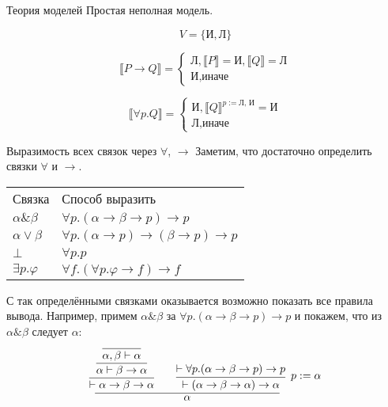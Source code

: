 \documentclass[aspectratio=169]{beamer}
\begin{document}
\begin{frame}{Теория моделей}
Простая неполная модель.

$$V = \{ \text{И}, \text{Л} \}$$

 	
 	
 \begin{center}
 		\begin{equation*}
 		\llbracket P\rightarrow Q\rrbracket = 
 		\begin{cases}
 			\text{Л}, \llbracket P\rrbracket = \text{И}, \llbracket Q\rrbracket = \text{Л} \\
 			\text{И}, \text{иначе}
 		\end{cases}
 	\end{equation*}
 \end{center}
 	
 	
 	\begin{equation*}
 		\llbracket\forall p.Q\rrbracket = 
 		\begin{cases}
 			\text{И}, \llbracket Q\rrbracket^{p:=\text{Л, И}} = \text{И} \\
 			\text{Л}, \text{иначе}
 		\end{cases}
 	\end{equation*}


\end{frame}

\begin{frame}[fragile]{Выразимость всех связок через $\forall$, $\rightarrow$}
Заметим, что достаточно определить связки $\forall$ и $\rightarrow$.\vspace{0.5cm}

\begin{tabular}{ll}
 Связка & Способ выразить \\
 $\alpha\&\beta$ & $\forall p.(\alpha\rightarrow\beta\rightarrow p)\rightarrow p$\\
 $\alpha\vee\beta$ & $\forall p.(\alpha\rightarrow p)\rightarrow (\beta\rightarrow p) \rightarrow p$\\
 $\bot$ & $\forall p.p$ \\
 $\exists p.\varphi$ & $\forall f.(\forall p.\varphi\rightarrow f) \rightarrow f$
\end{tabular}

\vspace{0.5cm}
С так определёнными связками оказывается возможно показать все правила вывода.
Например, примем $\alpha\&\beta$ за $\forall p.(\alpha\rightarrow\beta\rightarrow p)\rightarrow p$ и покажем,
что из $\alpha\&\beta$ следует $\alpha$:
$$\infer{\alpha}{
    \infer{\vdash\alpha\rightarrow\beta\rightarrow\alpha}{\infer{\alpha\vdash\beta\rightarrow\alpha}{\infer{\alpha,\beta\vdash\alpha}{}}}\quad\quad
    \infer[p := \alpha]{\vdash(\alpha\rightarrow\beta\rightarrow \alpha)\rightarrow \alpha}{\vdash\forall p.(\alpha\rightarrow\beta\rightarrow p)\rightarrow p}
}$$

\end{frame}
\end{document}
